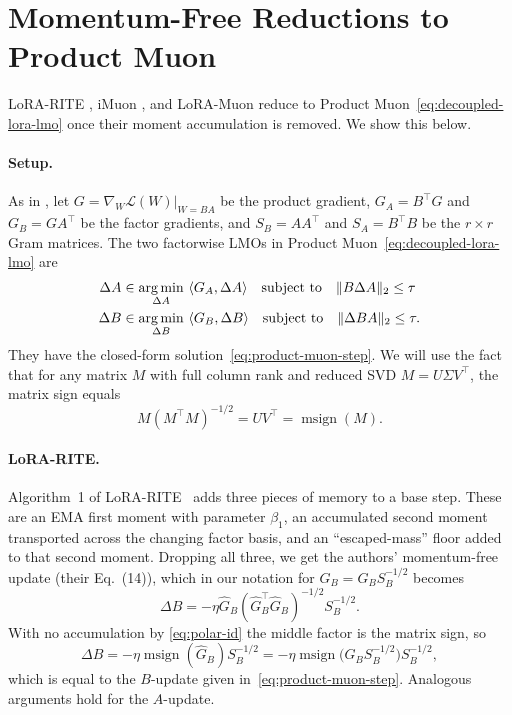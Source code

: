 \documentclass[11pt]{article}
\DeclareMathOperator*{\argmin}{arg\,min}
\newcommand{\ip}[1]{\langle #1 \rangle}
\DeclareMathOperator{\msign}{msign}
\newcommand{\norm}[1]{\| #1\|}
\theoremstyle{plain}
\theoremstyle{definition}
\theoremstyle{remark}
\theoremstyle{definition}
\begin{document}
\section{Momentum-Free Reductions to Product Muon}
\label{app:memoryless}
LoRA-RITE \cite{lorarite}, iMuon \cite{imuon}, and LoRA-Muon \cite{loramuon}
reduce to Product Muon~\eqref{eq:decoupled-lora-lmo} once their moment accumulation is removed. We show this below.


\paragraph{Setup.} As in , 
let $G=\nabla_W \mathcal{L}(W) \big |_{W=BA}$ be the product
gradient, $G_A=B^\top G$ and $G_B=GA^\top$ be the factor gradients, 
and $S_B=AA^\top$ and
$S_A=B^\top B$ be the $r\times r$ Gram matrices.
The two factorwise LMOs in Product Muon~\eqref{eq:decoupled-lora-lmo} are
\begin{equation}
  \begin{aligned}
  \Delta A &\in    \argmin_{\Delta A}~ \ip{G_A, \Delta A} \quad \textnormal{subject to}\quad
\norm{B \Delta A}_2\le\tau \\
\Delta B &\in   \argmin_{\Delta B}~ \ip{G_B,  \Delta B} \quad \textnormal{subject to}\quad  \norm{\Delta B A}_2\le\tau.
  \end{aligned}
  \label{eq:decoupled-lora-lmo-app} 
\end{equation}
They have the closed-form solution~\eqref{eq:product-muon-step}.
We will use the fact that for any matrix $M$ with full column rank and reduced SVD $M=U\Sigma V^\top$,
the matrix sign equals
\begin{equation}
  M(M^\top M)^{-1/2}=
  UV^\top=\msign(M).
  \label{eq:polar-id}
\end{equation}

\paragraph{LoRA-RITE.}
Algorithm~1 of LoRA-RITE~\cite{lorarite} adds three pieces of memory to a base step. These are an EMA first moment with parameter $\beta_1$, an accumulated second moment transported across the changing factor basis, and an ``escaped-mass'' floor added to that second moment.
Dropping all three, we get the authors' momentum-free update (their Eq.~(14)),
which in our notation for $ \widehat G_B=G_B S_B^{-1/2}$ becomes
\[
  \Delta B=-\eta \widehat G_B (\widehat G_B^\top\widehat G_B)^{-1/2} S_B^{-1/2}.
\]
With no accumulation by \eqref{eq:polar-id} the middle factor is the matrix sign, so
\begin{equation*}
  \Delta B=-\eta \msign(\widehat G_B) S_B^{-1/2}
  =-\eta \msign \big(G_B S_B^{-1/2}\big) S_B^{-1/2},
\end{equation*}
which is equal to the $B$-update given in~\eqref{eq:product-muon-step}. Analogous arguments hold for the $A$-update.
\end{document}
